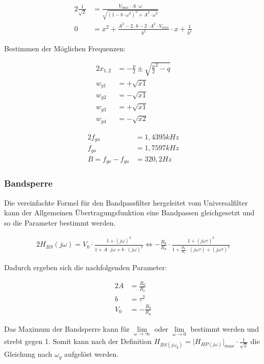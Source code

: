 \begin{alignat}{2}
\frac{1}{\sqrt{2}} &= \frac{V_{max} \cdot A \cdot \omega}{\sqrt{\left(1- b\cdot \omega^2 \right)^2 + A^2 \cdot \omega^2}}\\
0 &= x^2 + \frac{A^2 - 2 \cdot b - 2 \cdot A^2 \cdot V_{max}}{b^2} \cdot x + \frac{1}{b^2}
\end{alignat}

\noindent Bestimmen der Möglichen Frequenzen:

\begin{alignat}{2}
x_{1,2} &= -\frac{p}{2} \pm \sqrt{\frac{p}{2}^2 - q}\\
w_{g1} &= +\sqrt{x1}\\
w_{g2} &= -\sqrt{x1}\\
w_{g3} &= +\sqrt{x1}\\
w_{g4} &= -\sqrt{x2}
\end{alignat}

\begin{alignat}{2}
f_{gu} &= 1,4395 kHz\\
f_{go} &= 1,7597 kHz\\
B = f_{go} - f_{gu} &= 320,2 Hz
\end{alignat}

\newpage

\subsubsection{Bandsperre}

Die vereinfachte Formel für den Bandpassfilter hergeleitet vom Universalfilter kann der Allgemeinen Übertragungsfunktion eine Bandpassen gleichgesetzt und so die Parameter bestimmt werden.

\begin{alignat}{2}
H_{BS}(j\omega) = V_{0} \cdot \frac{1 + (j\omega)^2}{1 + A \cdot j \omega + b \cdot (j\omega)^2} \Longleftrightarrow - \frac{R_{0}}{R_{a}} \cdot \frac{1 + (j\omega \tau)^2}{1 + \frac{R_{0}}{R_{c}} \cdot (j\omega \tau) + (j\omega \tau)^2}
\end{alignat}

\noindent Dadurch ergeben sich die nachfolgenden Parameter:

\begin{alignat}{2}
A &= \frac{R_{0}}{R_{c}}\\
b &= \tau^2\\
V_{0} &= - \frac{R_{0}}{R_{a}}
\end{alignat}

\noindent Das Maximum der Bandsperre kann für $\lim\limits_{\omega \to \infty}$ oder $\lim\limits_{\omega \to 0}$ bestimmt werden und strebt gegen 1. Somit kann nach der Definition $H_{BS (j \omega_{g})} = \lvert H_{HP (j \omega)} \rvert_{max} \cdot \frac{1}{\sqrt{2}}$  die Gleichung nach $\omega_{g}$ aufgelöst werden.

